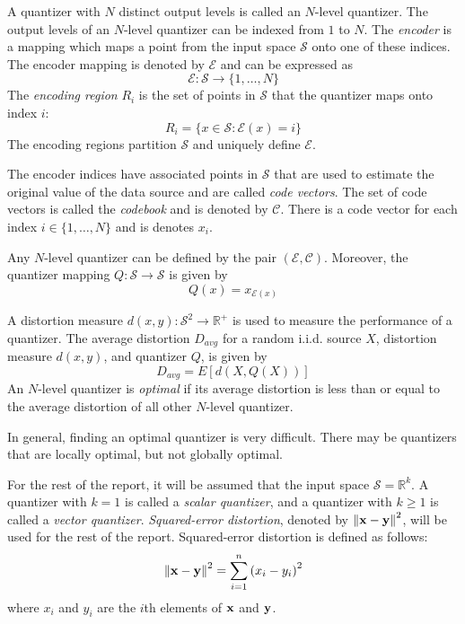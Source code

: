 \documentclass[10pt]{article}
\begin{document}
A quantizer with $N$ distinct output levels is called an $N$-level quantizer. The output levels of an $N$-level quantizer can be indexed from $1$ to $N$. The \emph{encoder} is a mapping which maps a point from the input space $\mathcal{S}$ onto one of these indices. The encoder mapping is denoted by $\mathcal{E}$ and can be expressed as
\begin{equation}
\mathcal{E} : \mathcal{S} \rightarrow \{1,\ldots,N\}
\end{equation}
The \emph{encoding region} $R_i$ is the set of points in $\mathcal{S}$ that the quantizer maps onto index $i$:
\begin{equation}
R_i = \{x \in \mathcal{S} : \mathcal{E}(x) = i\}
\end{equation}
The encoding regions partition $\mathcal{S}$ and uniquely define $\mathcal{E}$.

The encoder indices have associated points in $\mathcal{S}$ that are used to estimate the original value of the data source and are called \emph{code vectors}. The set of code vectors is called the \emph{codebook} and is denoted by $\mathcal{C}$. There is a code vector for each index $i \in \{1,\ldots,N\}$ and is denotes $x_i$.

Any $N$-level quantizer can be defined by the pair $(\mathcal{E}, \mathcal{C})$. Moreover, the quantizer mapping $Q : \mathcal{S} \rightarrow \mathcal{S}$ is given by
\begin{equation}
Q(x) = x_{\mathcal{E}(x)}
\end{equation}

A distortion measure $d(x,y) : \mathcal{S}^2 \rightarrow \mathbb{R}^+$ is used to measure the performance of a quantizer. The average distortion $D_{avg}$ for a random i.i.d. source $X$, distortion measure $d(x,y)$, and quantizer $Q$, is given by
\begin{equation}
  \label{eq:D_avg}
D_{avg} = E[d(X,Q(X))]
\end{equation}
An $N$-level quantizer is \emph{optimal} if its average distortion is less than or equal to the average distortion of all other $N$-level quantizer.
 
In general, finding an optimal quantizer is very difficult. There may be quantizers that are locally optimal, but not globally optimal.

For the rest of the report, it will be assumed that the input space $\mathcal{S}=\mathbb{R}^k$. A quantizer with $k=1$ is called a \emph{scalar quantizer}, and a quantizer with $k \ge 1$ is called a \emph{vector quantizer}. \emph{Squared-error distortion}, denoted by ${\bf {\| x - y \|}}^2$, will be used for the rest of the report. Squared-error distortion is defined as follows:
\begin{equation}
{\bf {\| x - y \|}}^2 = \sum_{i=1}^n{(x_i - y_i)}^2
\end{equation}
where $x_i$ and $y_i$ are the $i$th elements of $\bf x$ and $\bf y$.
\end{document}
